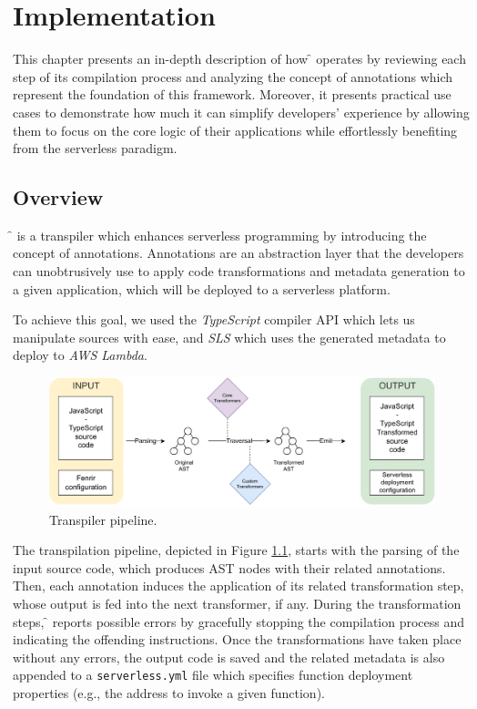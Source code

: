 \chapter{Implementation}
\label{chap:implementation}

This chapter presents an in-depth description of how \f{} operates
by reviewing each step of its compilation process and analyzing
the concept of annotations which represent the foundation of this framework.
Moreover, it presents practical use cases to demonstrate
how much it can simplify developers' experience
by allowing them to focus on the core logic of their applications
while effortlessly benefiting from the serverless paradigm.

\section{Overview}

\f{} is a transpiler which enhances serverless programming by introducing the concept of annotations.
Annotations are an abstraction layer that the developers can unobtrusively use
to apply code transformations and metadata generation to a given application,
which will be deployed to a serverless platform.

To achieve this goal, we used the \textit{TypeScript}\cite{ts} compiler API which lets us
manipulate sources with ease, and \textit{SLS}\cite{sls} which
uses the generated metadata to deploy to \textit{AWS Lambda}.

\begin{figure}[H]
  \centering
  \includegraphics[width=\textwidth]{diagrams/pipeline}
  \caption{Transpiler pipeline.}
  \label{fig:pipeline}
\end{figure}

The transpilation pipeline, depicted in Figure \ref{fig:pipeline},
starts with the parsing of the input source code, which produces AST nodes with their related
annotations. Then, each annotation induces the application of its related
transformation step, whose output is fed into the next transformer, if any.
During the transformation steps, \f{} reports possible errors by gracefully
stopping the compilation process and indicating the offending instructions. Once
the transformations have taken place without any errors, the output code is saved
and the related metadata is also appended to a
\verb|serverless.yml| file which specifies function deployment
properties (e.g., the address to invoke a given function).

